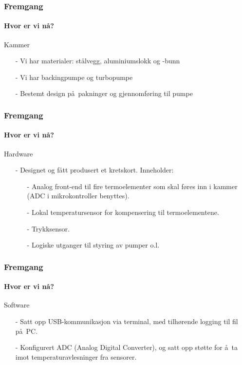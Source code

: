 \documentclass{beamer}
\begin{document}
  \begin{frame}
    \frametitle{Fremgang}
    \framesubtitle{Hvor er vi n\aa ?}
    \begin{block}{Kammer}
    	\begin{itemize}
    		\item[-] Vi har materialer: st\aa lvegg, aluminiumslokk og -bunn
    		\item[-] Vi har backingpumpe og turbopumpe
    		\item[-] Bestemt design p\aa\ pakninger og gjennomf\o ring til pumpe
    	\end{itemize}
    \end{block}
    \end{frame}
    
    \begin{frame}
    	\frametitle{Fremgang}
    	\framesubtitle{Hvor er vi n\aa ?}
    	\begin{block}{Hardware}
    		\begin{itemize}
    			\item[-] Designet og fått produsert et kretskort. Inneholder:
					\begin{itemize}
					\item[-] Analog front-end til fire termoelementer som skal føres inn i kammer (ADC i mikrokontroller benyttes).
					\item[-] Lokal temperatursensor for kompensering til termoelementene.
					\item[-] Trykksensor.
					\item[-] Logiske utganger til styring av pumper o.l.
					\end{itemize}
    		\end{itemize}
    	\end{block}
    \end{frame}
    
    \begin{frame}
    	\frametitle{Fremgang}
    	\framesubtitle{Hvor er vi n\aa ?}
    	\begin{block}{Software}
    		\begin{itemize}
    			\item[-] Satt opp USB-kommunikasjon via terminal, med tilh\o rende logging til fil p\aa\ PC.
    			\item[-] Konfigurert ADC (Analog Digital Converter), og satt opp st\o tte for \aa\ ta imot temperaturavlesninger fra sensorer.
    		\end{itemize}
    	\end{block}
    \end{frame}
\end{document}
